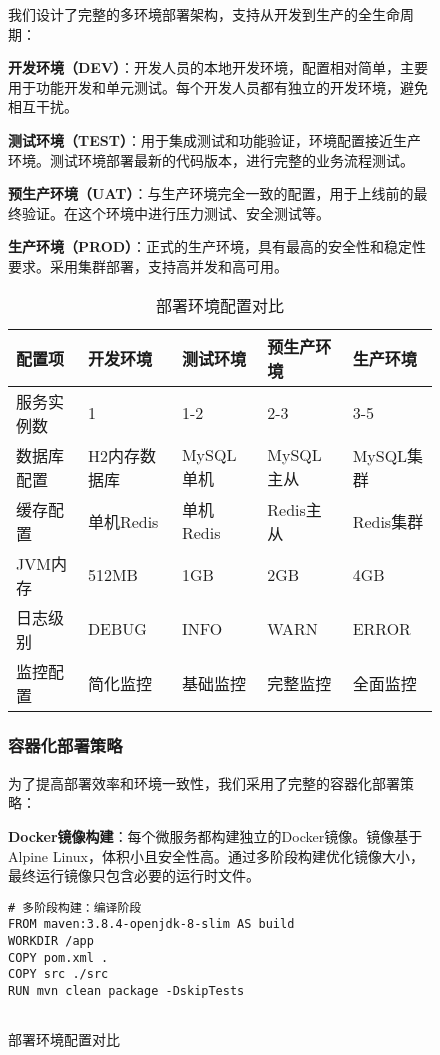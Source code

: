 \documentclass[a4paper,12pt]{article}
\begin{document}
\begin{figure}[H]
我们设计了完整的多环境部署架构，支持从开发到生产的全生命周期：

\textbf{开发环境（DEV）}：开发人员的本地开发环境，配置相对简单，主要用于功能开发和单元测试。每个开发人员都有独立的开发环境，避免相互干扰。

\textbf{测试环境（TEST）}：用于集成测试和功能验证，环境配置接近生产环境。测试环境部署最新的代码版本，进行完整的业务流程测试。

\textbf{预生产环境（UAT）}：与生产环境完全一致的配置，用于上线前的最终验证。在这个环境中进行压力测试、安全测试等。

\textbf{生产环境（PROD）}：正式的生产环境，具有最高的安全性和稳定性要求。采用集群部署，支持高并发和高可用。

\begin{table}[H]
\centering
\caption{部署环境配置对比}
\begin{tabular}{|p{2.5cm}|p{2.5cm}|p{2.5cm}|p{2.5cm}|p{2.5cm}|}
\hline
\textbf{配置项} & \textbf{开发环境} & \textbf{测试环境} & \textbf{预生产环境} & \textbf{生产环境} \\
\hline
服务实例数 & 1 & 1-2 & 2-3 & 3-5 \\
\hline
数据库配置 & H2内存数据库 & MySQL单机 & MySQL主从 & MySQL集群 \\
\hline
缓存配置 & 单机Redis & 单机Redis & Redis主从 & Redis集群 \\
\hline
JVM内存 & 512MB & 1GB & 2GB & 4GB \\
\hline
日志级别 & DEBUG & INFO & WARN & ERROR \\
\hline
监控配置 & 简化监控 & 基础监控 & 完整监控 & 全面监控 \\
\hline
\end{tabular}
\end{table}

\subsubsection{容器化部署策略}

为了提高部署效率和环境一致性，我们采用了完整的容器化部署策略：

\textbf{Docker镜像构建}：每个微服务都构建独立的Docker镜像。镜像基于Alpine Linux，体积小且安全性高。通过多阶段构建优化镜像大小，最终运行镜像只包含必要的运行时文件。

\begin{lstlisting}[caption=Dockerfile示例]
# 多阶段构建：编译阶段
FROM maven:3.8.4-openjdk-8-slim AS build
WORKDIR /app
COPY pom.xml .
COPY src ./src
RUN mvn clean package -DskipTests


\end{lstlisting}
\end{figure}
\end{document}
